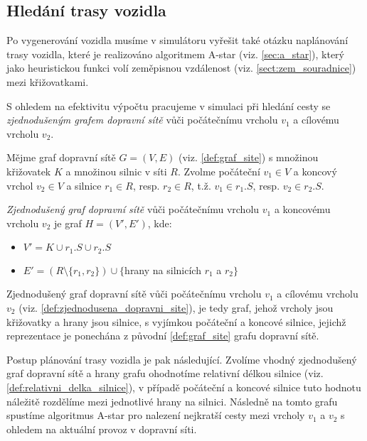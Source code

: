 \subsection{Hledání trasy vozidla}
\label{subsec:hledani_trasy}

Po vygenerování vozidla musíme v simulátoru vyřešit také otázku naplánování
trasy vozidla, které je realizováno algoritmem A-star (viz. \cref{sec:a_star}),
který jako heuristickou funkci volí zeměpisnou vzdálenost 
(viz. \cref{sect:zem_souradnice}) mezi křižovatkami.

S ohledem na efektivitu výpočtu pracujeme v simulaci při hledání cesty
se \emph{zjednodušeným grafem dopravní sítě} vůči počátečnímu vrcholu 
$v_1$ a cílovému vrcholu $v_2$.

\begin{defn}\label{def:zjednodusena_dopravni_site}
    Mějme graf dopravní sítě $G=(V, E)$ (viz. \cref{def:graf_site}) s množinou
    křižovatek $K$ a množinou silnic v síti $R$. Zvolme počáteční $v_1 \in V$ 
    a koncový vrchol $v_2 \in V$ a silnice $r_1 \in R$, resp. $r_2 \in R$, 
    t.ž. $v_1 \in r_1.S$, resp. $v_2 \in r_2.S$. 

    \emph{Zjednodušený graf dopravní sítě} vůči počátečnímu vrcholu $v_1$ a koncovému
    vrcholu $v_2$ je graf $H=(V', E')$, kde:
    \begin{itemize}
        \item $V' = K \cup r_1.S \cup r_2.S$
        \item $E' = (R \setminus \{r_1, r_2\}) \cup \{$hrany na silnicích $r_1$ a $r_2\}$
    \end{itemize}
\end{defn}

Zjednodušený graf dopravní sítě vůči počátečnímu vrcholu $v_1$ a cílovému vrcholu $v_2$
(viz. \cref{def:zjednodusena_dopravni_site}), je tedy graf, jehož vrcholy jsou křižovatky a
hrany jsou silnice, s vyjímkou počáteční a koncové silnice, jejichž reprezentace je
ponechána z původní \cref{def:graf_site} grafu dopravní sítě.

Postup plánování trasy vozidla je pak následující. Zvolíme vhodný zjednodušený graf dopravní
sítě a hrany grafu ohodnotíme relativní délkou silnice 
(viz. \cref{def:relativni_delka_silnice}), v případě počáteční a koncové silnice tuto
hodnotu náležitě rozdělíme mezi jednotlivé hrany na silnici. Následně na tomto grafu 
spustíme algoritmus A-star pro nalezení nejkratší cesty mezi vrcholy $v_1$ a $v_2$ s
ohledem na aktuální provoz v dopravní síti.

